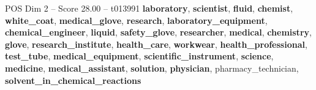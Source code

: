 \begin{textsample}{POS Dim 2 – Score 28.00 – t013991}  \label{ex:f2_pos_027}
\textbf{laboratory}, \textbf{scientist}, \textbf{fluid}, \textbf{chemist}, \textbf{white\_coat}, \textbf{medical\_glove}, \textbf{research}, \textbf{laboratory\_equipment}, \textbf{chemical\_engineer}, \textbf{liquid}, \textbf{safety\_glove}, \textbf{researcher}, \textbf{medical}, \textbf{chemistry}, \textbf{glove}, \textbf{research\_institute}, \textbf{health\_care}, \textbf{workwear}, \textbf{health\_professional}, \textbf{test\_tube}, \textbf{medical\_equipment}, \textbf{scientific\_instrument}, \textbf{science}, \textbf{medicine}, \textbf{medical\_assistant}, \textbf{solution}, \textbf{physician}, pharmacy\_technician, \textbf{solvent\_in\_chemical\_reactions}

\end{textsample}
